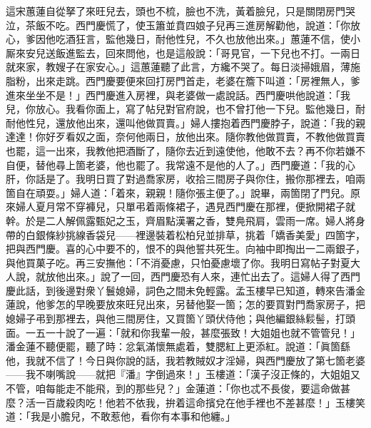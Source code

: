 這宋蕙蓮自從拏了來旺兒去，頭也不梳，臉也不洗，黃着臉兒，只是關閉房門哭泣，茶飯不吃。西門慶慌了，使玉簫並賁四娘子兒再三進房解勸他，說道：「你放心，爹因他吃酒狂言，監他幾日，耐他性兒，不久也放他出來。」蕙蓮不信，使小厮來安兒送飯進監去，回來問他，也是這般說：「哥見官，一下兒也不打。一兩日就來家，教嫂子在家安心。」這蕙蓮聽了此言，方纔不哭了。每日淡掃娥眉，薄施脂粉，出來走跳。西門慶要便來回打房門首走，老婆在簷下叫道：「房裡無人，爹進來坐坐不是！」西門慶進入房裡，與老婆做一處說話。西門慶哄他說道：「我兒，你放心。我看你面上，寫了帖兒對官府說，也不曾打他一下兒。監他幾日，耐耐他性兒，還放他出來，還叫他做買賣。」婦人摟抱着西門慶脖子，說道：「我的親達達！你好歹看奴之面，{}奈何他兩日，放他出來。隨你教他做買賣，不教他做買賣也罷，這一出來，我教他把酒斷了，隨你去近到遠使他，他敢不去？再不你若嫌不自便，替他尋上箇老婆，他也罷了。我常遠不是他的人了。」西門慶道：「我的心肝，你話是了。我明日買了對過喬家房，收拾三間房子與你住，搬你那裡去，咱兩箇自在頑耍。」婦人道：「着來，親親！隨你張主便了。」說畢，兩箇閉了門兒。原來婦人夏月常不穿褲兒，只單弔着兩條裙子，遇見西門慶在那裡，便掀開裙子就幹。於是二人解佩露甄妃之玉，齊眉點漢署之香，雙鳧飛肩，雲雨一席。婦人將身帶的白銀條紗挑線香袋兒——裡邊裝着松柏兒並排草，挑着「嬌香美愛」四箇字，把與西門慶。喜的心中要不的，恨不的與他誓共死生。向袖中即掏出一二兩銀子，與他買菓子吃。再三安撫他：「不消憂慮，只怕憂慮壞了你。我明日寫帖子對夏大人說，就放他出來。」說了一回，西門慶恐有人來，連忙出去了。這婦人得了西門慶此話，到後邊對衆丫鬟媳婦，詞色之間未免輕露。{}孟玉樓早已知道，轉來告潘金蓮說，他爹怎的早晚要放來旺兒出來，另替他娶一箇；怎的要買對門喬家房子，把媳婦子弔到那裡去，與他三間房住，又買箇丫頭伏侍他；與他編銀絲鬏髻，打頭面。一五一十說了一遍：「就和你我輩一般，甚麼張致！大姐姐也就不管管兒！」潘金蓮不聽便罷，聽了時：忿氣滿懷無處着，雙腮紅上更添紅。說道：「眞箇繇他，我就不信了！今日與你說的話，我若教賊奴才淫婦，與西門慶放了第七箇老婆——我不喇嘴說——就把『潘』字倒過來！」玉樓道：「漢子沒正條的，大姐姐又不管，咱每能走不能飛，到的那些兒？」{}金蓮道：「你也忒不長俊，要這命做甚麼？活一百歲殺肉吃！他若不依我，拚着這命擯兌在他手裡也不差甚麼！」玉樓笑道：「我是小膽兒，不敢惹他，看你有本事和他纏。」

